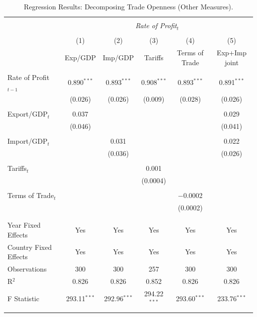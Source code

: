 \documentclass[10pt]{article}
\begin{document}
\begin{table}[!htbp]
\small
\centering
\caption{Regression Results: Decomposing Trade Openness (Other Measures).}
\label{table:other_trade_measures}
\begin{tabular}{@{\extracolsep{4pt}}lccccc}
  \\[-1.5ex]\hline
  \hline \\[-1.5ex]
  & \multicolumn{5}{c}{\textit{Rate of Profit$_t$}} \\
  \\[-1.5ex] & (1) & (2) & (3) & (4) & (5) \\
  & Exp/GDP & Imp/GDP & Tariffs & Terms of Trade & Exp+Imp joint \\
  \hline \\[-1.5ex]
  Rate of Profit$_{t-1}$ & 0.890$^{***}$ & 0.893$^{***}$ & 0.908$^{***}$ & 0.893$^{***}$ & 0.891$^{***}$ \\
  & (0.026) & (0.026) & (0.009) & (0.028) & (0.026) \\
  \\
  Export/GDP$_t$ & 0.037 &  &  &  & 0.029 \\
  & (0.046) &  &  &  & (0.041) \\
  \\
  Import/GDP$_t$ &  & 0.031 &  &  & 0.022 \\
  &  & (0.036) &  &  & (0.026) \\
  \\
  Tariffs$_t$ &  &  & 0.001 &  &  \\
  &  &  & (0.0004) &  &  \\
  \\
  Terms of Trade$_t$ &  &  &  & $-$0.0002 &  \\
  &  &  &  & (0.0002) &  \\
  \\
  \hline \\[-1.5ex]
  Year Fixed Effects & Yes & Yes & Yes & Yes & Yes \\
  Country Fixed Effects & Yes & Yes & Yes & Yes & Yes \\
  Observations & 300 & 300 & 257 & 300 & 300 \\
  R$^{2}$ & 0.826 & 0.826 & 0.852 & 0.826 & 0.826 \\
  F Statistic & 293.11$^{***}$ & 292.96$^{***}$ & 294.22$^{***}$ & 293.60$^{***}$ & 233.76$^{***}$ \\
  \hline
  \hline \\[-1.5ex]
\end{tabular}
\begin{minipage}[t]{\textwidth}

\end{minipage}
\end{table}
\end{document}
